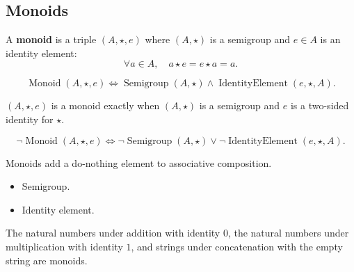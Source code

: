 \subsection{Monoids}
\label{subsec:monoids}

\begin{tcolorbox}[title={Definition --- Monoid}]
\begin{definition}[Monoid]
\label{def:monoid}
A \textbf{monoid} is a triple $(A,\star,e)$ where $(A,\star)$ is a semigroup
and $e\in A$ is an identity element:
\[
\forall a \in A,\quad a\star e=e\star a=a.
\]
\end{definition}
\end{tcolorbox}

\begin{remark*}
\[
\operatorname{Monoid}(A,\star,e)
\Longleftrightarrow
\operatorname{Semigroup}(A,\star)
\land
\operatorname{IdentityElement}(e,\star,A).
\]
\end{remark*}

\begin{remark*}
$(A,\star,e)$ is a monoid exactly when $(A,\star)$ is a semigroup and $e$ is a
two-sided identity for $\star$.
\end{remark*}

\begin{remark*}
\[
\neg\operatorname{Monoid}(A,\star,e)
\Longleftrightarrow
\neg\operatorname{Semigroup}(A,\star)
\lor
\neg\operatorname{IdentityElement}(e,\star,A).
\]
\end{remark*}

\begin{remark*}[Interpretation]
Monoids add a do-nothing element to associative composition.
\end{remark*}

\begin{remark*}[Dependencies]
\begin{itemize}
  \item Semigroup.
  \item Identity element.
\end{itemize}
\end{remark*}

\begin{remark*}[Examples]
The natural numbers under addition with identity $0$, the natural numbers under
multiplication with identity $1$, and strings under concatenation with the
empty string are monoids.
\end{remark*}
